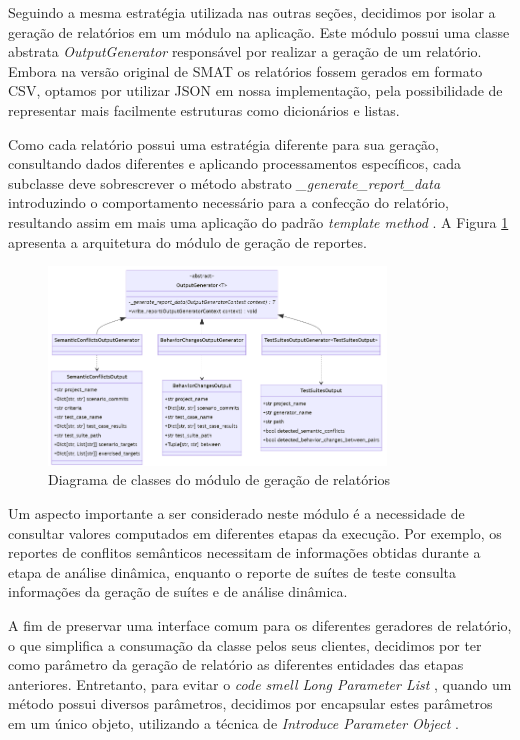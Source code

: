 \documentclass[12pt]{article}
\begin{document}
Seguindo a mesma estratégia utilizada nas outras seções, decidimos por isolar a geração de relatórios em um módulo na aplicação. Este módulo possui uma classe abstrata \textit{OutputGenerator} responsável por realizar a geração de um relatório. Embora na versão original de SMAT os relatórios fossem gerados em formato CSV, optamos por utilizar JSON em nossa implementação, pela possibilidade de representar mais facilmente estruturas como dicionários e listas.

Como cada relatório possui uma estratégia diferente para sua geração, consultando dados diferentes e aplicando processamentos específicos, cada subclasse deve sobrescrever o método abstrato \textit{\_generate\_report\_data} introduzindo o comportamento necessário para a confecção do relatório, resultando assim em mais uma aplicação do padrão \textit{template method} \cite{gof}. A Figura \ref{fig:output} apresenta a arquitetura do módulo de geração de reportes.

\begin{figure}[H]
    \centering
    \includegraphics[width=0.8\textwidth]{imagens/output.png}
    \caption{Diagrama de classes do módulo de geração de relatórios}
    \label{fig:output}
\end{figure}

Um aspecto importante a ser considerado neste módulo é a necessidade de consultar valores computados em diferentes etapas da execução. Por exemplo, os reportes de conflitos semânticos necessitam de informações obtidas durante a etapa de análise dinâmica, enquanto o reporte de suítes de teste consulta informações da geração de suítes e de análise dinâmica.

A fim de preservar uma interface comum para os diferentes geradores de relatório, o que simplifica a consumação da classe pelos seus clientes, decidimos por ter como parâmetro da geração de relatório as diferentes entidades das etapas anteriores. Entretanto, para evitar o \textit{code smell Long Parameter List} \cite{fowler2018refactoring}, quando um método possui diversos parâmetros, decidimos por encapsular estes parâmetros em um único objeto, utilizando a técnica de \textit{Introduce Parameter Object} \cite{fowler2018refactoring}.
\end{document}
